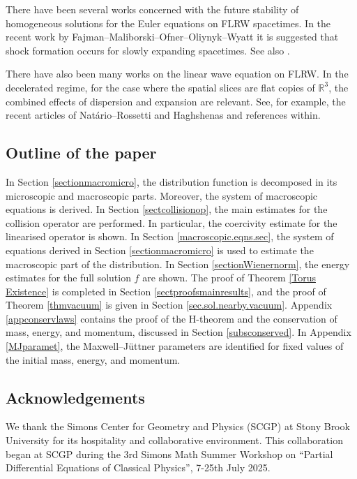 \documentclass[reqno]{amsart}
\theoremstyle{definition}
\numberwithin{equation}{section}
\numberwithin{theorem}{section}
\begin{document}
There have been several works \cite{FOOW25a, FMOOW, S13} concerned with the future stability of homogeneous solutions for the Euler equations on FLRW spacetimes. In the recent work \cite{FMOOW} by Fajman--Maliborski--Ofner--Oliynyk--Wyatt it is suggested that shock formation occurs for slowly expanding spacetimes. See also \cite{FMOOW25a}. 

There have also been many works on the linear wave equation on FLRW.  In the decelerated regime, for the case where the spatial slices are flat copies of $\mathbb{R}^3$, the combined effects of dispersion and expansion are relevant.  See, for example, the recent articles of Nat\'{a}rio–Rossetti \cite{NR23} and Haghshenas \cite{H25} and references within.



\subsection{Outline of the paper}

In Section \ref{sectionmacromicro}, the distribution function is decomposed in its microscopic and macroscopic parts. Moreover, the system of macroscopic equations is derived. In Section \ref{sectcollisionop}, the main estimates for the collision operator are performed. In particular, the coercivity estimate for the linearised operator is shown. In Section \ref{macroscopic.eqns.sec}, the system of equations derived in Section \ref{sectionmacromicro} is used to estimate the macroscopic part of the distribution. In Section \ref{sectionWienernorm}, the energy estimates for the full solution \(f\) are shown. The proof of Theorem \ref{Torus Existence} is completed in Section \ref{sectproofsmainresults}, and the proof of Theorem \ref{thmvacuum} is given in Section \ref{sec.sol.nearby.vacuum}. Appendix \ref{appconservlaws} contains the proof of the H-theorem and the conservation of mass, energy, and momentum, discussed in Section \ref{subsconserved}. In Appendix \ref{MJparamet}, the Maxwell--J\"uttner parameters are identified for fixed values of the initial mass, energy, and momentum.


\subsection{Acknowledgements}
We thank the Simons Center for Geometry and Physics (SCGP) at Stony Brook University for its hospitality and collaborative environment.  This collaboration began at SCGP during the 3rd Simons Math Summer Workshop on “Partial Differential Equations of Classical Physics”, 7-25th July 2025.  
\end{document}
